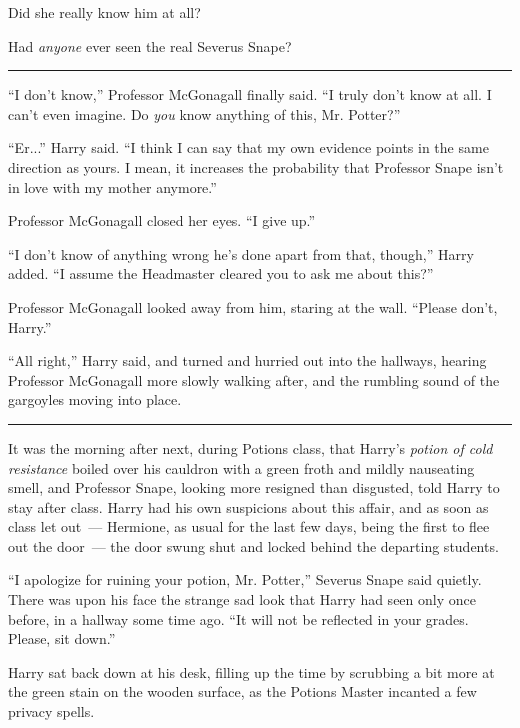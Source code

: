 Did she really know him at all?

Had \emph{anyone} ever seen the real Severus Snape?

\begin{center}\rule{3in}{0.4pt}\end{center}

``I don't know,'' Professor McGonagall finally said. ``I truly don't know at all. I can't even imagine. Do \emph{you} know anything of this, Mr. Potter?''

``Er...'' Harry said. ``I think I can say that my own evidence points in the same direction as yours. I mean, it increases the probability that Professor Snape isn't in love with my mother anymore.''

Professor McGonagall closed her eyes. ``I give up.''

``I don't know of anything wrong he's done apart from that, though,'' Harry added. ``I assume the Headmaster cleared you to ask me about this?''

Professor McGonagall looked away from him, staring at the wall. ``Please don't, Harry.''

``All right,'' Harry said, and turned and hurried out into the hallways, hearing Professor McGonagall more slowly walking after, and the rumbling sound of the gargoyles moving into place.

\begin{center}\rule{3in}{0.4pt}\end{center}

It was the morning after next, during Potions class, that Harry's \emph{potion of cold resistance} boiled over his cauldron with a green froth and mildly nauseating smell, and Professor Snape, looking more resigned than disgusted, told Harry to stay after class. Harry had his own suspicions about this affair, and as soon as class let out~--- Hermione, as usual for the last few days, being the first to flee out the door~--- the door swung shut and locked behind the departing students.

``I apologize for ruining your potion, Mr. Potter,'' Severus Snape said quietly. There was upon his face the strange sad look that Harry had seen only once before, in a hallway some time ago. ``It will not be reflected in your grades. Please, sit down.''

Harry sat back down at his desk, filling up the time by scrubbing a bit more at the green stain on the wooden surface, as the Potions Master incanted a few privacy spells.

